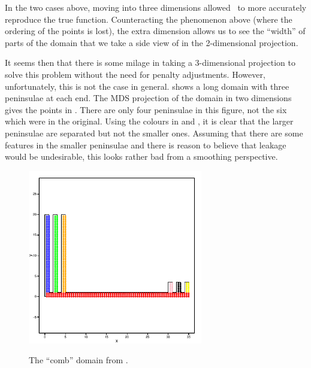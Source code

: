 {In the two cases above, moving into three dimensions allowed \mdsap\ to more accurately reproduce the true function. Counteracting the phenomenon above (where the ordering of the points is lost), the extra dimension allows us to see the ``width'' of parts of the domain that we take a side view of in the 2-dimensional projection.

It seems then that there is some milage in taking a 3-dimensional projection to solve this problem without the need for penalty adjustments. However, unfortunately, this is not the case in general.  shows a long domain with three peninsulae at each end. The MDS projection of the domain in two dimensions gives the points in . There are only four peninsulae in this figure, not the six which were in the original. Using the colours in  and , it is clear that the larger peninsulae are separated but not the smaller ones. Assuming that there are some features in the smaller peninsulae and there is reason to believe that leakage would be undesirable, this looks rather bad from a smoothing perspective.

\begin{figure}
\centering
\includegraphics[width=3in]{mds/figs/comb.pdf} \\
\caption{The ``comb'' domain from .}
\label{mds-comb}
\end{figure}

}
